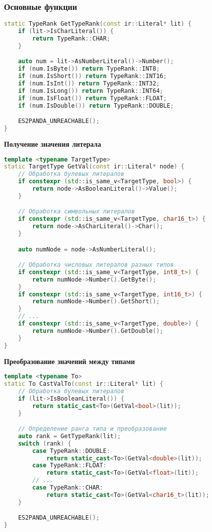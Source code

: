 \subsubsection{Основные функции}
\begin{lstlisting}[language=C++,caption=GetTypeRank]
static TypeRank GetTypeRank(const ir::Literal* lit) {
    if (lit->IsCharLiteral()) {
        return TypeRank::CHAR;
    }

    auto num = lit->AsNumberLiteral()->Number();
    if (num.IsByte()) return TypeRank::INT8;
    if (num.IsShort()) return TypeRank::INT16;
    if (num.IsInt()) return TypeRank::INT32;
    if (num.IsLong()) return TypeRank::INT64;
    if (num.IsFloat()) return TypeRank::FLOAT;
    if (num.IsDouble()) return TypeRank::DOUBLE;

    ES2PANDA_UNREACHABLE();
}
\end{lstlisting}

\textbf{Получение значения литерала}
\begin{lstlisting}[language=C++,caption=GetVal]
template <typename TargetType>
static TargetType GetVal(const ir::Literal* node) {
    // Обработка булевых литералов
    if constexpr (std::is_same_v<TargetType, bool>) {
        return node->AsBooleanLiteral()->Value();
    }

    // Обработка символьных литералов
    if constexpr (std::is_same_v<TargetType, char16_t>) {
        return node->AsCharLiteral()->Char();
    }

    auto numNode = node->AsNumberLiteral();

    // Обработка числовых литералов разных типов
    if constexpr (std::is_same_v<TargetType, int8_t>) {
        return numNode->Number().GetByte();
    }
    if constexpr (std::is_same_v<TargetType, int16_t>) {
        return numNode->Number().GetShort();
    }
    // ...
    if constexpr (std::is_same_v<TargetType, double>) {
        return numNode->Number().GetDouble();
    }
}
\end{lstlisting}

\textbf{Преобразование значений между типами}
\begin{lstlisting}[language=C++,caption=CastValTo]
template <typename To>
static To CastValTo(const ir::Literal* lit) {
    // Обработка булевых литералов
    if (lit->IsBooleanLiteral()) {
        return static_cast<To>(GetVal<bool>(lit));
    }

    // Определение ранга типа и преобразование
    auto rank = GetTypeRank(lit);
    switch (rank) {
        case TypeRank::DOUBLE:
            return static_cast<To>(GetVal<double>(lit));
        case TypeRank::FLOAT:
            return static_cast<To>(GetVal<float>(lit));
        // ...
        case TypeRank::CHAR:
            return static_cast<To>(GetVal<char16_t>(lit));
    }

    ES2PANDA_UNREACHABLE();
}
\end{lstlisting}


